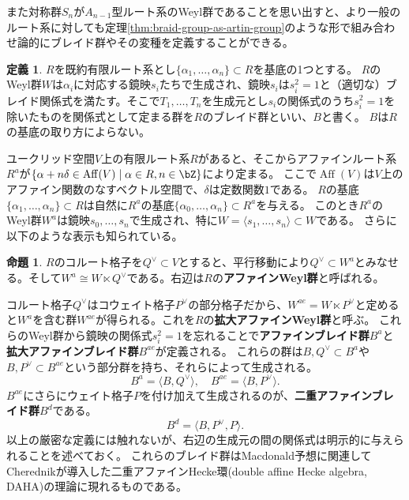 \documentclass[uplatex,11pt,a4paper,dvipdfmx]{jsarticle}
\numberwithin{equation}{section}
\numberwithin{figure}{section}
\theoremstyle{definition}
\newtheorem{proposition}[theorem]{命題}
\newtheorem{definition}[theorem]{定義}
\DeclareMathOperator{\Aff}{Aff}
\begin{document}
また対称群$S_n$が$A_{n-1}$型ルート系のWeyl群であることを思い出すと、より一般のルート系に対しても定理\ref{thm:braid-group-as-artin-group}のような形で組み合わせ論的にブレイド群やその変種を定義することができる。
\begin{definition}
    $R$を既約有限ルート系とし$\{\alpha_1, \dots, \alpha_n\} \subset R$を基底の1つとする。
    $R$のWeyl群$W$は$\alpha_i$に対応する鏡映$s_i$たちで生成され、鏡映$s_i$は$s_i^2=1$と（適切な）ブレイド関係式を満たす。そこで$T_1, \dots, T_n$を生成元とし$s_i$の関係式のうち$s_i^2=1$を除いたものを関係式として定まる群を$R$のブレイド群といい、$B$と書く。
    $B$は$R$の基底の取り方によらない。
\end{definition}
ユークリッド空間$V$上の有限ルート系$R$があると、そこからアファインルート系$R^{a}$が$\{\alpha + n \delta \in \Aff(V) \mid \alpha \in R, n \in \bZ\}$により定まる。
ここで$\Aff(V)$は$V$上のアファイン関数のなすベクトル空間で、$\delta$は定数関数$1$である。
$R$の基底$\{\alpha_1, \dots, \alpha_n\} \subset R$は自然に$R^{a}$の基底$\{\alpha_0, \dots, \alpha_n\} \subset R^{a}$を与える。
このとき$R^{a}$のWeyl群$W^{a}$は鏡映$s_0, \dots, s_n$で生成され、特に$W = \langle s_1, \dots, s_n\rangle \subset W$である。
さらに以下のような表示も知られている。
\begin{proposition}
    $R$のコルート格子を$Q^\vee \subset V$とすると、平行移動により$Q^\vee \subset W^{a}$とみなせる。そして$W^{a} \cong W \ltimes Q^\vee$である。右辺は$R$の\textbf{アファインWeyl群}と呼ばれる。
\end{proposition}
コルート格子$Q^\vee$はコウェイト格子$P^\vee$の部分格子だから、$W^{ae} = W \ltimes P^\vee$と定めると$W^{a}$を含む群$W^{ae}$が得られる。これを$R$の\textbf{拡大アファインWeyl群}と呼ぶ。
これらのWeyl群から鏡映の関係式$s_i^2 = 1$を忘れることで\textbf{アファインブレイド群}$B^{a}$と\textbf{拡大アファインブレイド群}$B^{ae}$が定義される。
これらの群は$B, Q^\vee \subset B^{a}$や$B, P^\vee \subset B^{ae}$という部分群を持ち、それらによって生成される。
\begin{equation}
    B^{a} = \langle B, Q^\vee \rangle, \quad B^{ae} = \langle B, P^\vee \rangle.
\end{equation}
$B^{ae}$にさらにウェイト格子$P$を付け加えて生成されるのが、\textbf{二重アファインブレイド群}$B^{d}$である。
\begin{equation}
    B^{d} = \langle B, P^\vee, P\rangle.
\end{equation}
以上の厳密な定義には触れないが、右辺の生成元の間の関係式は明示的に与えられることを述べておく。
これらのブレイド群はMacdonald予想に関連してCherednikが導入した二重アファインHecke環(double affine Hecke algebra, DAHA)の理論に現れるものである。
\end{document}
